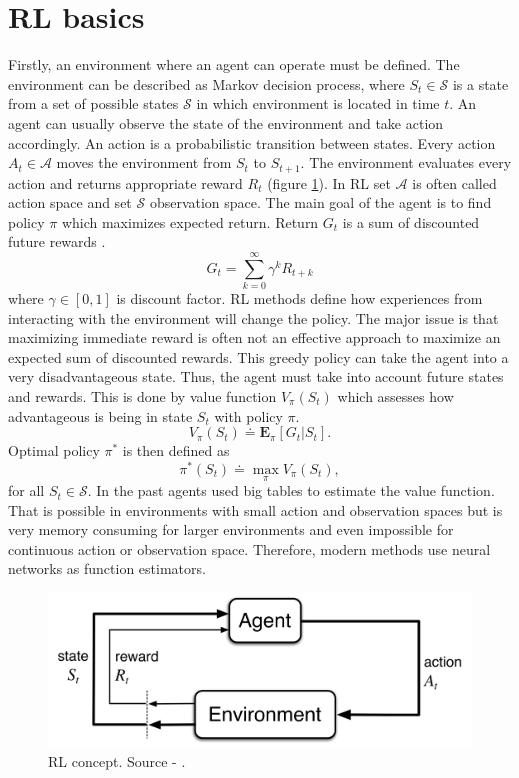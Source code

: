 \section{RL basics}
Firstly, an environment where an agent can operate must be defined. The environment can be described as Markov decision process, where $S_t \in \mathcal{S}$ is a state from a set of possible states $\mathcal{S}$ in which environment is located in time $t$. An agent can usually observe the state of the environment and take action accordingly. An action is a probabilistic transition between states. Every action $A_t \in \mathcal{A}$ moves the environment from $S_t$ to $S_{t+1}$. The environment evaluates every action and returns appropriate reward $R_t$ (figure \ref{fig:rlconcept}). In RL set $\mathcal{A}$ is often called action space and set $\mathcal{S}$ observation space. The main goal of the agent is to find policy $\pi$ which maximizes expected return. Return $G_t$ is a sum of discounted future rewards \cite{sutton2012}.
\begin{equation}
G_t = \sum\limits_{k=0}^{\infty}\gamma^k R_{t+k}
\end{equation}
where $\gamma \in [0,1]$ is discount factor. RL methods define how experiences from interacting with the environment will change the policy.  The major issue is that maximizing immediate reward is often not an effective approach to maximize an expected sum of discounted rewards. This greedy policy can take the agent into a very disadvantageous state. Thus, the agent must take into account future states and rewards. This is done by value function $V_{\pi}(S_t)$ which assesses how advantageous is being in state $S_t$ with policy $\pi$.
\begin{equation}
V_{\pi}(S_t) \doteq  \mathbf{E}_\pi[G_t | S_t].
\end{equation}
Optimal policy $\pi^*$ is then defined as
\begin{equation}
\pi^*(S_t) \doteq \max\limits_\pi V_\pi(S_t),
\end{equation}
for all $S_t \in \mathcal{S}$.
In the past agents used big tables to estimate the value function. That is possible in environments with small action and observation spaces but is very memory consuming for larger environments and even impossible for continuous action or observation space. Therefore, modern methods use neural networks as function estimators.
\begin{figure}[!h]
\centering
\includegraphics[scale=0.3]{fig/RL-concept.png}
\caption[RL concept]{RL concept. Source - \cite{sutton2012}.}
\label{fig:rlconcept}
\end{figure}
\pagebreak

